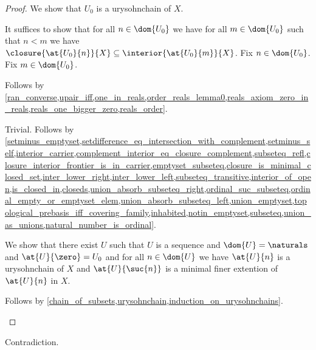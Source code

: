 \begin{proof}
    We show that $U_0$ is a urysohnchain of $X$.
    \begin{subproof}
        It suffices to show that for all $n \in \dom{U_0}$ we have for all $m \in \dom{U_0}$ such that $n < m$ we have $\closure{\at{U_0}{n}}{X} \subseteq \interior{\at{U_0}{m}}{X}$.
        Fix $n \in \dom{U_0}$.
        Fix $m \in \dom{U_0}$.
        \begin{byCase}
                Follows by \cref{ran_converse,upair_iff,one_in_reals,order_reals_lemma0,reals_axiom_zero_in_reals,reals_one_bigger_zero,reals_order}.
                \begin{byCase}
                        Trivial.
                        Follows by \cref{setminus_emptyset,setdifference_eq_intersection_with_complement,setminus_self,interior_carrier,complement_interior_eq_closure_complement,subseteq_refl,closure_interior_frontier_is_in_carrier,emptyset_subseteq,closure_is_minimal_closed_set,inter_lower_right,inter_lower_left,subseteq_transitive,interior_of_open,is_closed_in,closeds,union_absorb_subseteq_right,ordinal_suc_subseteq,ordinal_empty_or_emptyset_elem,union_absorb_subseteq_left,union_emptyset,topological_prebasis_iff_covering_family,inhabited,notin_emptyset,subseteq,union_as_unions,natural_number_is_ordinal}.
                \end{byCase}
        \end{byCase}
    \end{subproof}

    We show that there exist $U$ such that $U$ is a sequence and $\dom{U} = \naturals$ and $\at{U}{\zero} = U_0$ and for all $n \in \dom{U}$ we have $\at{U}{n}$ is a urysohnchain of $X$ and $\at{U}{\suc{n}}$ is a minimal finer extention of $\at{U}{n}$ in $X$.
    \begin{subproof}
        Follows by \cref{chain_of_subsets,urysohnchain,induction_on_urysohnchains}.
    \end{subproof}



    
\end{proof}

\begin{theorem}\label{safe}
    Contradiction.     
\end{theorem}





%
%
%
%
%
%
%
%
%
%

